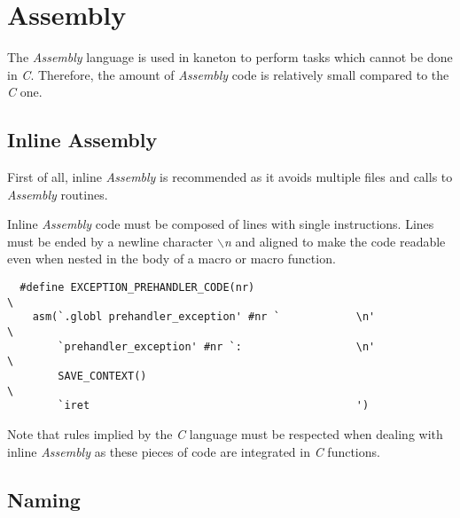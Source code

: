 %
%
%
%
%
%

%
%

\section{Assembly}
\label{section:assembly}

The \textit{Assembly} language is used in kaneton to perform tasks which
cannot be done in \textit{C}. Therefore, the amount of \textit{Assembly}
code is relatively small compared to the \textit{C} one.

%
%

\subsection{Inline Assembly}

First of all, inline \textit{Assembly} is recommended as it avoids multiple
files and calls to \textit{Assembly} routines.

Inline \textit{Assembly} code must be composed of lines with single
instructions. Lines must be ended by a newline character \textit{$\backslash$n}
and aligned to make the code readable even when nested in the body of a macro
or macro function.

\begin{verbatim}
  #define EXCEPTION_PREHANDLER_CODE(nr)                                 \
    asm(`.globl prehandler_exception' #nr `            \n'              \
        `prehandler_exception' #nr `:                  \n'              \
        SAVE_CONTEXT()                                                  \
        `iret                                          ')
\end{verbatim}

Note that rules implied by the \textit{C} language must be respected when
dealing with inline \textit{Assembly} as these pieces of code are integrated
in \textit{C} functions.

%
%

\subsection{Naming}

